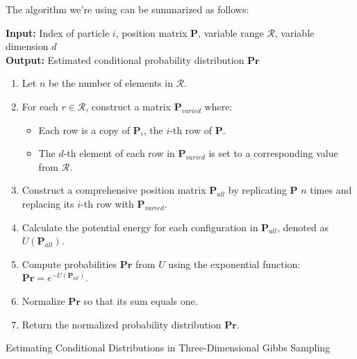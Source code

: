 \documentclass{report}
\begin{document}
The algorithm we're using can be summarized as follows:

\begin{center}
    \begin{minipage}{0.7\linewidth}
        \begin{algorithm}[H]
            \textbf{Input:} Index of particle \( i \), position matrix \( \mathbf{P} \), variable range \( \mathcal{R} \), variable dimension \( d \) \\
            \textbf{Output:} Estimated conditional probability distribution \( \mathbf{Pr} \)
            \begin{enumerate}
                \item Let \( n \) be the number of elements in \( \mathcal{R} \).
                \item For each \( r \in \mathcal{R} \), construct a matrix \( \mathbf{P}_{varied} \) where:
                      \begin{itemize}
                          \item Each row is a copy of \( \mathbf{P}_i \), the \( i \)-th row of \( \mathbf{P} \).
                          \item The \( d \)-th element of each row in \( \mathbf{P}_{varied} \) is set to a corresponding value from \( \mathcal{R} \).
                      \end{itemize}
                \item Construct a comprehensive position matrix \( \mathbf{P}_{all} \) by replicating \( \mathbf{P} \) \( n \) times and replacing its \( i \)-th row with \( \mathbf{P}_{varied} \).
                \item Calculate the potential energy for each configuration in \( \mathbf{P}_{all} \), denoted as \( U(\mathbf{P}_{all}) \).
                \item Compute probabilities \( \mathbf{Pr} \) from \( U \) using the exponential function: \( \mathbf{Pr} = e^{-U(\mathbf{P}_{all})} \). 
                \item Normalize \( \mathbf{Pr} \) so that its sum equals one.
                \item Return the normalized probability distribution \( \mathbf{Pr} \).
            \end{enumerate}
            \caption{Estimating Conditional Distributions in Three-Dimensional Gibbs Sampling}
            \label{alg:conditional_distribution_math}
        \end{algorithm}
    \end{minipage}
\end{center}
\end{document}
